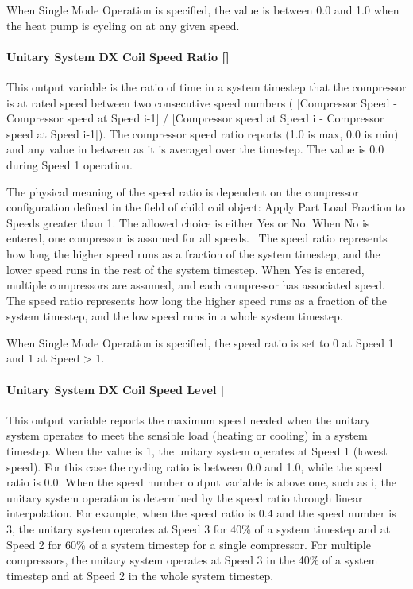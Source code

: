 When Single Mode Operation is specified, the value is between 0.0 and 1.0 when the heat pump is cycling on at any given speed.

\paragraph{Unitary System DX Coil Speed Ratio {[]}}\label{unitary-system-dx-coil-speed-ratio}

This output variable is the ratio of time in a system timestep that the compressor is at rated speed between two consecutive speed numbers ( {[}Compressor Speed - Compressor speed at Speed i-1{]} / {[}Compressor speed at Speed i - Compressor speed at Speed i-1{]}). The compressor speed ratio reports (1.0 is max, 0.0 is min) and any value in between as it is averaged over the timestep. The value is 0.0 during Speed 1 operation.

The physical meaning of the speed ratio is dependent on the compressor configuration defined in the field of child coil object: Apply Part Load Fraction to Speeds greater than 1. The allowed choice is either Yes or No. When No is entered, one compressor is assumed for all speeds. ~The speed ratio represents how long the higher speed runs as a fraction of the system timestep, and the lower speed runs in the rest of the system timestep. When Yes is entered, multiple compressors are assumed, and each compressor has associated speed. The speed ratio represents how long the higher speed runs as a fraction of the system timestep, and the low speed runs in a whole system timestep.

When Single Mode Operation is specified, the speed ratio is set to 0 at Speed 1 and 1 at Speed \textgreater{} 1.

\paragraph{Unitary System DX Coil Speed Level {[]}}\label{unitary-system-dx-coil-speed-level}

This output variable reports the maximum speed needed when the unitary system operates to meet the sensible load (heating or cooling) in a system timestep. When the value is 1, the unitary system operates at Speed 1 (lowest speed). For this case the cycling ratio is between 0.0 and 1.0, while the speed ratio is 0.0. When the speed number output variable is above one, such as i, the unitary system operation is determined by the speed ratio through linear interpolation. For example, when the speed ratio is 0.4 and the speed number is 3, the unitary system operates at Speed 3 for 40\% of a system timestep and at Speed 2 for 60\% of a system timestep for a single compressor. For multiple compressors, the unitary system operates at Speed 3 in the 40\% of a system timestep and at Speed 2 in the whole system timestep.

